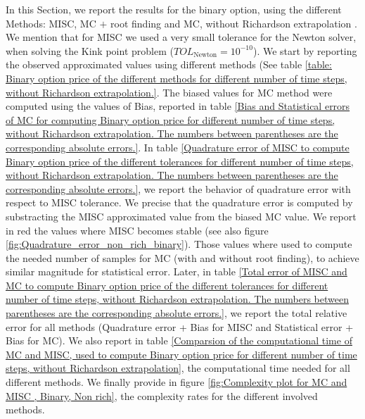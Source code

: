\documentclass[11pt]{article}
\begin{document}
In this Section, we report the results for the binary option, using the different Methods: MISC, MC $+$ root finding  and MC, without Richardson extrapolation . We mention that for MISC we used a very small tolerance for the Newton solver, when solving the Kink point problem ($TOL_{\text{Newton}}=10^{-10}$). We start by reporting the observed approximated values using different methods (See table \ref{table: Binary option price of the different methods for different number of time steps, without Richardson extrapolation.}. The biased values for MC method were computed using the values of Bias, reported in table \ref{Bias and Statistical errors of MC  for computing Binary option price  for different number of time steps, without Richardson extrapolation. The numbers between parentheses are the corresponding absolute errors.}. In table \ref{Quadrature error of MISC to compute Binary option price of the different tolerances for different number of time steps, without Richardson extrapolation. The numbers between parentheses are the corresponding absolute errors.}, we report the behavior of quadrature error with respect to MISC tolerance. We precise that the quadrature error is computed by substracting the MISC approximated value from the biased MC value. We report in red the values where MISC becomes stable (see also figure \ref{fig:Quadrature_error_non_rich_binary}). Those values where used to compute the needed number of samples for MC (with and without root finding), to achieve similar magnitude  for statistical error. Later, in table \ref{Total error of MISC and MC to compute Binary option price of the different tolerances for different number of time steps, without Richardson extrapolation. The numbers between parentheses are the corresponding absolute errors.}, we report the total relative error for all methods (Quadrature error + Bias for MISC and Statistical error + Bias for MC). We also report in table \ref{Comparsion of the computational time of  MC and MISC, used to compute Binary option price  for different number of time steps, without Richardson extrapolation}, the computational time needed for all different methods.  We finally provide in figure \ref{fig:Complexity plot for MC and MISC , Binary, Non rich}, the complexity rates for the different involved methods.
\end{document}
